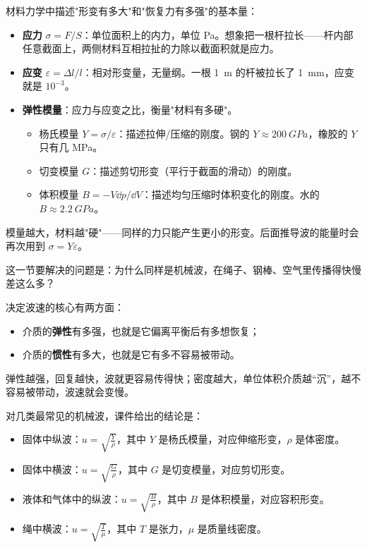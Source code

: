 \documentclass[lang=cn,11pt]{elegantbook}
\begin{document}
\begin{definition}[应力、应变与弹性模量]\label{def:elastic-modulus}
材料力学中描述"形变有多大"和"恢复力有多强"的基本量：
\begin{itemize}
  \item \textbf{应力} \(\sigma=F/S\)：单位面积上的内力，单位 \unit{Pa}。想象把一根杆拉长——杆内部任意截面上，两侧材料互相拉扯的力除以截面积就是应力。
  \item \textbf{应变} \(\varepsilon=\Delta l/l\)：相对形变量，无量纲。一根 \SI{1}{m} 的杆被拉长了 \SI{1}{mm}，应变就是 \(10^{-3}\)。
  \item \textbf{弹性模量}：应力与应变之比，衡量"材料有多硬"。
  \begin{itemize}
    \item 杨氏模量 \(Y=\sigma/\varepsilon\)：描述拉伸/压缩的刚度。钢的 \(Y\approx\SI{200}{GPa}\)，橡胶的 \(Y\) 只有几 MPa。
    \item 切变模量 \(G\)：描述剪切形变（平行于截面的滑动）的刚度。
    \item 体积模量 \(B=-V\dd p/\dd V\)：描述均匀压缩时体积变化的刚度。水的 \(B\approx\SI{2.2}{GPa}\)。
  \end{itemize}
\end{itemize}
模量越大，材料越"硬"——同样的力只能产生更小的形变。后面推导波的能量时会再次用到 \(\sigma=Y\varepsilon\)。
\end{definition}

这一节要解决的问题是：为什么同样是机械波，在绳子、钢棒、空气里传播得快慢差这么多？

决定波速的核心有两方面：
\begin{itemize}
  \item 介质的\textbf{弹性}有多强，也就是它偏离平衡后有多想恢复；
  \item 介质的\textbf{惯性}有多大，也就是它有多不容易被带动。
\end{itemize}

弹性越强，回复越快，波就更容易传得快；密度越大，单位体积介质越“沉”，越不容易被带动，波速就会变慢。

对几类最常见的机械波，课件给出的结论是：
\begin{itemize}
  \item 固体中纵波：\(u=\sqrt{\frac{Y}{\rho}}\)，其中 \(Y\) 是杨氏模量，对应伸缩形变，\(\rho\) 是体密度。
  \item 固体中横波：\(u=\sqrt{\frac{G}{\rho}}\)，其中 \(G\) 是切变模量，对应剪切形变。
  \item 液体和气体中的纵波：\(u=\sqrt{\frac{B}{\rho}}\)，其中 \(B\) 是体积模量，对应容积形变。
  \item 绳中横波：\(u=\sqrt{\frac{T}{\mu}}\)，其中 \(T\) 是张力，\(\mu\) 是质量线密度。
\end{itemize}
\end{document}
